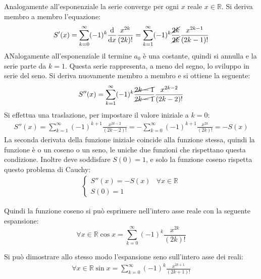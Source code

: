 \documentclass{article}
\numberwithin{equation}{subsection}
\begin{document}
Analogamente all'esponenziale la serie converge per ogni $x$ reale $x\in\mathbb{R}$. Si deriva membro a membro l'equazione:
\begin{gather*}
    S'(x)=\displaystyle\sum_{k=0}^\infty(-1)^k\frac{\mathrm{d}}{\mathrm{d}x}\frac{x^{2k}}{(2k)!}=
    \sum_{k=1}^\infty(-1)^k\frac{\cancel{2k}}{\cancel{2k}}\frac{x^{2k-1}}{(2k-1)!}
\end{gather*}
ANalogamente all'esponenziale il termine $a_0$ è una costante, quindi si annulla e la serie parte da $k=1$. Questa serie rappresenta, a meno del segno, lo sviluppo in serie del seno. Si deriva nuovamente membro a membro e si ottiene la seguente:
\begin{gather*}
    S''(x)=\displaystyle\sum_{k=1}^\infty(-1)^k\frac{\cancel{2k-1}}{\cancel{2k-1}}\frac{x^{2k-2}}{(2k-2)!}
\end{gather*}
Si effettua una traslazione, per impostare il valore iniziale a $k=0$:
\begin{gather*}
    S''(x)=\displaystyle\sum_{k=1}^\infty(-1)^{k+1}\frac{x^{2k-2}}{(2k-2)!}=
    -\sum_{k=0}^\infty(-1)^{k+1}\frac{x^{2k}}{(2k)!}=-S(x)
\end{gather*}
La seconda derivata della funzione iniziale coincide alla funzione stessa, quindi la funzione è o un coseno o un seno, le uniche due funzioni che rispettano questa condizione. Inoltre deve soddisfare $S(0)=1$, e solo la funzione coseno rispetta questo problema di Cauchy:
\begin{gather*}
    \begin{cases}
        S''(x)=-S(x)&\forall x\in\mathbb{R}\\
        S(0)=1
    \end{cases}
\end{gather*}

Quindi la funzione coseno si può esprimere nell'intero asse reale con la seguente espansione:
\begin{equation}
    \forall x\in\mathbb{R}\cos x=\displaystyle\sum_{k=0}^\infty (-1)^k\frac{x^{2k}}{(2k)!}
\end{equation}


Si può dimostrare allo stesso modo l'espansione seno sull'intero asse dei reali:
\begin{gather*}
    \forall x\in\mathbb{R} \sin x=\displaystyle\sum_{k=0}^\infty(-1)^k\frac{x^{2k+1}}{(2k+1)!}
\end{gather*}

\clearpage
\end{document}
